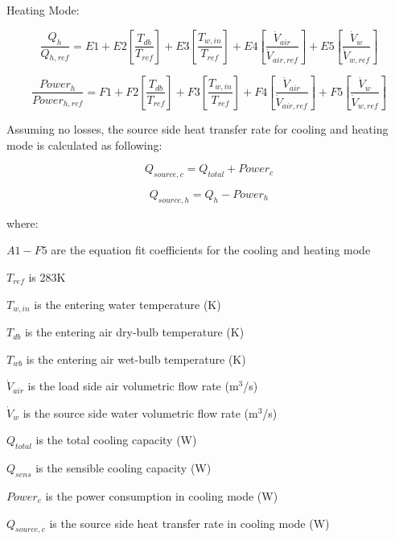 Heating Mode:

\begin{equation}
\frac{{{Q_h}}}{{Q{}_{h,ref}}} = E1 + E2\left[ {\frac{{{T_{db}}}}{{{T_{ref}}}}} \right] + E3\left[ {\frac{{T{}_{w,in}}}{{T{}_{ref}}}} \right] + E4\left[ {\frac{{{{\dot V}_{air}}}}{{{{\dot V}_{air,ref}}}}} \right] + E5\left[ {\frac{{{{\dot V}_w}}}{{{{\dot V}_{w,ref}}}}} \right]
\end{equation}

\begin{equation}
\frac{{Power{_h}}}{{Power{}_{h,ref}}} = F1 + F2\left[ {\frac{{{T_{db}}}}{{{T_{ref}}}}} \right] + F3\left[ {\frac{{T{}_{w,in}}}{{T{}_{ref}}}} \right] + F4\left[ {\frac{{{{\dot V}_{air}}}}{{{{\dot V}_{air,ref}}}}} \right] + F5\left[ {\frac{{{{\dot V}_w}}}{{{{\dot V}_{w,ref}}}}} \right]
\end{equation}

Assuming no losses, the source side heat transfer rate for cooling and heating mode is calculated as following:

\begin{equation}
{Q_{source,c}} = {Q_{total}} + Powe{r_c}
\end{equation}

\begin{equation}
{Q_{source,h}} = {Q_h} - Powe{r_h}
\end{equation}

where:

\(A1 - F5\) are the equation fit coefficients for the cooling and heating mode

\({T_{ref}}\) is 283K

\({T_{w,in}}\) is the entering water temperature (K)

\({T_{db}}\) is the entering air dry-bulb temperature (K)

\({T_{wb}}\) is the entering air wet-bulb temperature (K)

\({\dot V_{air}}\) is the load side air volumetric flow rate (m\(^{3}\)/s)

\({\dot V_w}\) is the source side water volumetric flow rate (m\(^{3}\)/s)

\({Q_{total}}\) is the total cooling capacity (W)

\({Q_{sens}}\) is the sensible cooling capacity (W)

\(Powe{r_c}\) is the power consumption in cooling mode (W)

\({Q_{source,c}}\) is the source side heat transfer rate in cooling mode (W)

